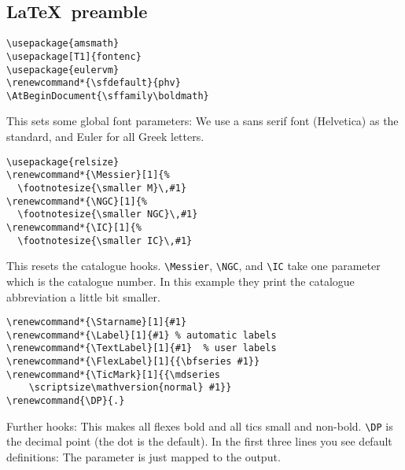 \documentclass{article}
\newcommand{\subsubskip}{\bigskip}
\begin{document}
\begin{multicols*}{3}
\section{\LaTeX\ preamble}

\begin{lstlisting}[language={[LaTeX]TeX}]
\usepackage{amsmath}
\usepackage[T1]{fontenc}
\usepackage{eulervm}
\renewcommand*{\sfdefault}{phv}
\AtBeginDocument{\sffamily\boldmath}
\end{lstlisting}
This sets some global font parameters: We use a sans serif font (Helvetica) as
the standard, and Euler for all Greek letters.\subsubskip

\lstset{language=[LaTeX]TeX}

\begin{lstlisting}
\usepackage{relsize}
\renewcommand*{\Messier}[1]{%
  \footnotesize{\smaller M}\,#1}
\renewcommand*{\NGC}[1]{%
  \footnotesize{\smaller NGC}\,#1}
\renewcommand*{\IC}[1]{%
  \footnotesize{\smaller IC}\,#1}
\end{lstlisting}
This resets the catalogue hooks.  \lstinline{\Messier}, \lstinline{\NGC}, and
\lstinline{\IC} take one parameter which is the catalogue number.  In this
example they print the catalogue abbreviation a little bit smaller.\subsubskip

\begin{lstlisting}
\renewcommand*{\Starname}[1]{#1}
\renewcommand*{\Label}[1]{#1} % automatic labels
\renewcommand*{\TextLabel}[1]{#1}  % user labels
\renewcommand*{\FlexLabel}[1]{{\bfseries #1}}
\renewcommand*{\TicMark}[1]{{\mdseries
    \scriptsize\mathversion{normal} #1}}
\renewcommand{\DP}{.}
\end{lstlisting}
Further hooks: This makes all flexes bold and all tics small and non-bold.
\lstinline{\DP} is the decimal point (the dot is the default).  In the first
three lines you see default definitions: The parameter is just mapped to
the output.

\end{multicols*}
\end{document}
